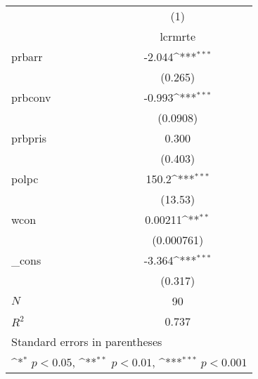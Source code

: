 {
\def\sym#1{\ifmmode^{#1}\else\(^{#1}\)\fi}
\begin{tabular}{l*{1}{c}}
\hline\hline
            &\multicolumn{1}{c}{(1)}\\
            &\multicolumn{1}{c}{lcrmrte}\\
\hline
prbarr      &      -2.044\sym{***}\\
            &     (0.265)         \\
[1em]
prbconv     &      -0.993\sym{***}\\
            &    (0.0908)         \\
[1em]
prbpris     &       0.300         \\
            &     (0.403)         \\
[1em]
polpc       &       150.2\sym{***}\\
            &     (13.53)         \\
[1em]
wcon        &     0.00211\sym{**} \\
            &  (0.000761)         \\
[1em]
\_cons      &      -3.364\sym{***}\\
            &     (0.317)         \\
\hline
\(N\)       &          90         \\
\(R^{2}\)   &       0.737         \\
\hline\hline
\multicolumn{2}{l}{\footnotesize Standard errors in parentheses}\\
\multicolumn{2}{l}{\footnotesize \sym{*} \(p<0.05\), \sym{**} \(p<0.01\), \sym{***} \(p<0.001\)}\\
\end{tabular}
}
